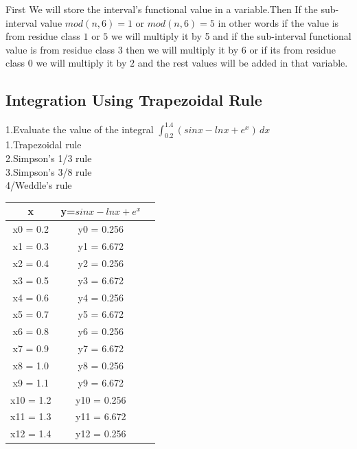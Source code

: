 \documentclass{article}
\begin{document}
First We will store the interval's functional value in a variable.Then If the sub-interval value $mod(n,6)=1$ or $mod(n,6)=5$ in other words if the value is from residue class $1$ or $5$ we will multiply it by 5 and if the sub-interval functional value is from residue class $3$ then we will multiply it by $6$ or if its from residue class $0$ we will multiply it by $2$ and the rest values will be added in that variable.







\subsection{Integration Using Trapezoidal Rule}
1.Evaluate the value of the integral $ \int_{0.2}^{1.4} (sinx-lnx+e^x) \,dx $\\
1.Trapezoidal rule\\
2.Simpson's 1/3 rule\\
3.Simpson's 3/8 rule\\
4/Weddle's rule\\
\begin{center}
\begin{tabular}{ |c|c|c| } 
\hline
 x & y=$sinx-lnx+e^x$\\ 
 \hline
 x0 = 0.2 & y0 = 0.256  \\ 
 \hline
 x1 = 0.3 & y1 = 6.672 \\ \hline
 x2 = 0.4 & y2 = 0.256  \\ \hline
 x3 = 0.5 & y3 = 6.672 \\ \hline
 x4 = 0.6 & y4 = 0.256  \\ \hline
 x5 = 0.7 & y5 = 6.672 \\ \hline
 x6 = 0.8 & y6 = 0.256  \\ \hline
 x7 = 0.9 & y7 = 6.672 \\ \hline
 x8 = 1.0 & y8 = 0.256  \\ \hline
 x9 = 1.1 & y9 = 6.672 \\ \hline
 x10 = 1.2 & y10 = 0.256  \\ \hline
 x11 = 1.3 & y11 = 6.672 \\ \hline
 x12 = 1.4 & y12 = 0.256  \\ \hline

 
 \hline
\end{tabular}
\end{center}
\end{document}
